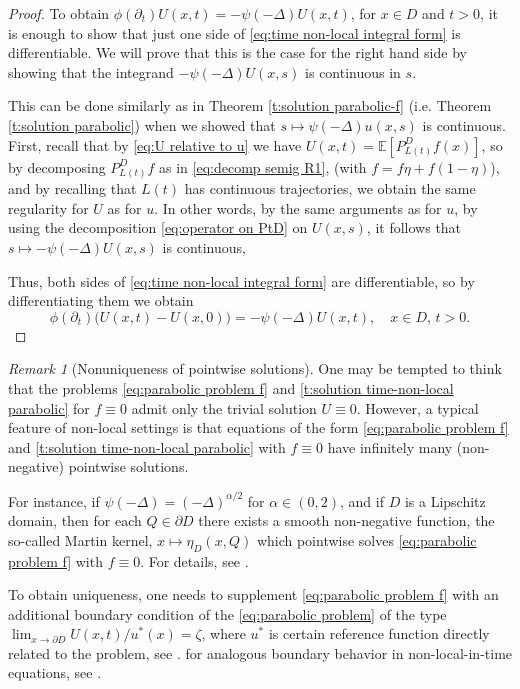 \documentclass[reqno]{amsart}
\theoremstyle{remark}
\newtheorem{remark}[theorem]{Remark}
\numberwithin{equation}{section} %
\newcommand{\Lpsi}{\psi(-\Delta)}
\newcommand{\1}{\mathds{1}}
\begin{document}
\begin{proof}
		
		
		To obtain $\phi(\partial_t)U(x,t)=-\Lpsi U(x,t)$, for $x\in D$ and $t>0$, it is enough to show that just one side of \eqref{eq:time non-local integral form} is differentiable. We will prove that this is the case for the right hand side by showing that the integrand $-\Lpsi U(x,s)$ is continuous in $s$. 
		
		This can be done similarly as in Theorem \ref{t:solution parabolic-f} (i.e. Theorem \ref{t:solution parabolic}) when we showed that $s\mapsto \Lpsi u(x,s)$ is continuous. First, recall that by \eqref{eq:U relative to u} we have $U(x,t)=\mathds{E}[ P^D_{L(t)}f(x)]$, so by decomposing $ P^D_{L(t)}f$ as in \eqref{eq:decomp semig R1}, (with $f=f\eta+f(1-\eta)$), and by recalling that $L(t)$ has continuous trajectories, we obtain the same regularity for $U$ as for $u$. In other words, by the same arguments as for $u$, by using the decomposition \eqref{eq:operator on PtD} on $U(x,s)$, it follows that $s\mapsto-\Lpsi U(x,s)$ is continuous,
		
		Thus, both sides of \eqref{eq:time non-local integral form} are differentiable, so by differentiating them we obtain 
		$$ \phi(\partial_t)\big(U(x,t)-U(x,0)\big)=-\Lpsi U(x,t),\quad x\in D,\,t>0.$$
	\end{proof}
	
	
	\begin{remark}[Nonuniqueness of pointwise solutions]
		One may be tempted to think that the problems \eqref{eq:parabolic problem f} and \eqref{t:solution time-non-local parabolic} for $f\equiv 0$ admit only the trivial solution $U\equiv 0$. However, a typical feature of non-local settings is that equations of the form  \eqref{eq:parabolic problem f} and \eqref{t:solution time-non-local parabolic} with $f\equiv 0$ have infinitely many (non-negative) pointwise solutions. 
		
		For instance, if $\Lpsi = (-\Delta)^{\alpha/2}$ for $\alpha\in (0,2)$, and if $D$ is a Lipschitz domain, then for each $Q\in \partial D$ there exists a smooth non-negative function, the so-called Martin kernel, $x\mapsto \eta_D(x,Q)$ which pointwise solves \eqref{eq:parabolic problem f} with $f\equiv 0$. For details, see \cite{ABR25}.
		
		To obtain uniqueness, one needs to supplement \eqref{eq:parabolic problem f} with an additional boundary condition of the \eqref{eq:parabolic problem} of the type $\lim_{x\to \partial D}U(x,t)/u^*(x)=\zeta$, where $u^*$ is certain reference function directly related to the problem, see \cite{CGCV22}. for analogous boundary behavior in non-local-in-time equations, see \cite{CGCV24}.
	\end{remark}
	
\end{document}
